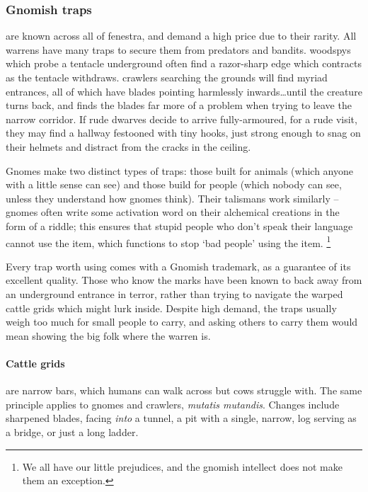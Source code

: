 \subsubsection{Gnomish traps}
are known across all of \gls{fenestra}, and demand a high price due to their rarity.
All warrens have many traps to secure them from predators and bandits.
\Glspl{woodspy} which probe a tentacle underground often find a razor-sharp edge which contracts as the tentacle withdraws.
\Glspl{crawler} searching the grounds will find myriad entrances, all of which have blades pointing harmlessly inwards\ldots until the creature turns back, and finds the blades far more of a problem when trying to leave the narrow corridor.
If rude dwarves decide to arrive fully-armoured, for a rude visit, they may find a hallway festooned with tiny hooks, just strong enough to snag on their helmets and distract from the cracks in the ceiling.

Gnomes make two distinct types of traps: those built for animals (which anyone with a little sense can see) and those build for people (which nobody can see, unless they understand how gnomes think).
Their \glspl{talisman} work similarly -- gnomes often write some activation word on their alchemical creations in the form of a riddle; this ensures that stupid people who don't speak their language cannot use the item, which functions to stop `bad people' using the item.%
\footnote{We all have our little prejudices, and the gnomish intellect does not make them an exception.}

Every trap worth using comes with a Gnomish trademark, as a guarantee of its excellent quality.
Those who know the marks have been known to back away from an underground entrance in terror, rather than trying to navigate the warped cattle grids which might lurk inside.
Despite high demand, the traps usually weigh too much for small people to carry, and asking others to carry them would mean showing the big folk where the warren is.

\paragraph{Cattle grids}
are narrow bars, which humans can walk across but cows struggle with.
The same principle applies to gnomes and \glspl{crawler}, \textit{mutatis mutandis}.
Changes include sharpened blades, facing \emph{into} a tunnel, a pit with a single, narrow, log serving as a bridge, or just a long ladder.

